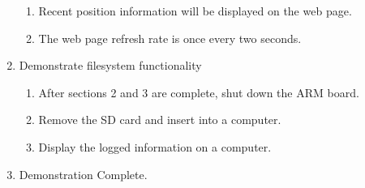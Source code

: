 \documentclass[10pt,letterpaper]{article}
\begin{document}
\begin{enumerate}
\begin{enumerate}
	\item Recent position information will be displayed on the web page.
	\item The web page refresh rate is once every two seconds.
	\end{enumerate}
\item Demonstrate filesystem functionality
	\begin{enumerate}
	\item After sections 2 and 3 are complete, shut down the ARM board.
	\item Remove the SD card and insert into a computer.
	\item Display the logged information on a computer.
	\end{enumerate}
\item Demonstration Complete.
\end{enumerate}
\end{document}
